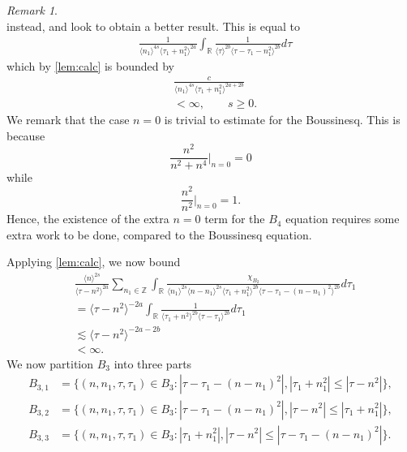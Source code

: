 \documentclass[12pt,reqno]{amsart}
\numberwithin{equation}{section}  %
\numberwithin{figure}{section}
\newcommand{\rr}{\mathbb{R}}
\newcommand{\zz}{\mathbb{Z}}
\theoremstyle{plain}
\theoremstyle{definition}
\theoremstyle{remark}
\newtheorem{remark}{Remark}
\begin{document}
\begin{framed}
\begin{remark}
\begin{equation}
\end{equation}
instead, and look to obtain a better result. This is equal to 
%
\begin{equation*}
\begin{split}
  & \frac{1}{\langle n_{1} \rangle ^{4s}
  \langle \tau_{1} + n_{1}^{2} \rangle
  ^{2a}} \int_{\rr} \frac{1}{\langle
  \tau  \rangle ^{2b} \langle \tau - \tau_{1} - n_{1}^{2}
  \rangle ^{2b}} d \tau
\end{split}
\end{equation*}
%
%
which by \autoref{lem:calc} is bounded by
%
%
\begin{equation*}
\begin{split}
  & \frac{c}{\langle n_{1} \rangle ^{4s}
  \langle \tau_{1} + n_{1}^{2} \rangle
  ^{2a + 2b}}
\\
& < \infty, \qquad s \ge 0. 
\end{split}
\end{equation*}
%
%
We remark that the case $n=0$ is trivial to estimate for the Boussinesq. This is
because  $$\frac{n^{2}}{n^{2} + n^{4}} |_{n=0} = 0$$ while
$$\frac{n^{2}}{n^{2}} |_{n=0} = 1.$$ 
Hence, the existence of the extra $n = 0$ term 
for the $B_{4}$ equation requires some extra work to be done, compared to the
Boussinesq equation. 
\end{remark}
\end{framed}
Applying \autoref{lem:calc}, we now bound 
\begin{equation*}
  \begin{split}
    & \frac{ \langle n
    \rangle ^{2s}}{\langle \tau - n^{2} \rangle ^{2a}}
    \sum_{n_{1} \in \zz} \int_{\rr} \frac{\chi_{B_{2}}}{ \langle n_{1} \rangle ^{2s} \langle n-n_{1} \rangle ^{2s} 
    \langle \tau_{1} + n_{1}^{2} \rangle^{2b} \langle  \tau - \tau_{1} -
    (n - n_{1})^{2} \rangle^{2b} }
    d \tau_1 
    \\
    & = 
   \langle \tau -n^{2} \rangle ^{-2a}\int_{\rr} \frac{1}{\langle \tau_{1} +
  n^{2} \rangle ^{2b}\langle
  \tau - \tau_{1}\rangle ^{2b}}d \tau_{1}
  \\
  & \lesssim 
  \langle \tau - n^{2} \rangle ^{-2a-2b} 
  \\
  & < \infty.
\end{split}
\end{equation*}
%
%
We now 
partition $ B_{3}$ into three parts
\begin{align*}
B_{3,1}&=\{(n, n_1, \tau, \tau_1)\in B_3:
|\tau-\tau_1-(n-n_1)^2|, |\tau_1+n_1^2| \le |\tau-n^2|\},\\
B_{3,2}&=\{(n, n_1, \tau, \tau_1)\in B_3:
|\tau-\tau_1-(n-n_1)^2|, |\tau-n^2| \le |\tau_1+n_1^2|\},\\
B_{3,3}&=\{(n, n_1, \tau, \tau_1)\in B_3: |\tau_{1}+n_{1}^2|, | \tau - n^{2} | \le |  \tau - \tau_{1} -
(n - n_{1})^{2} |\}.
\end{align*} 
\end{document}
